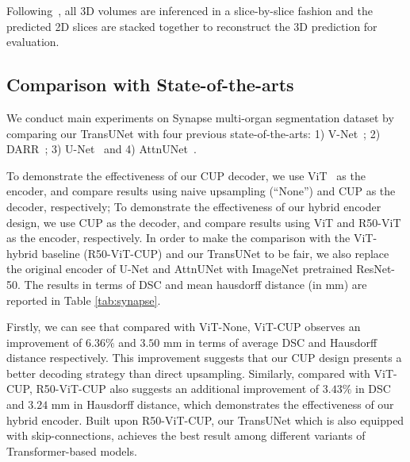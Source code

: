 \documentclass[runningheads]{llncs}
\begin{document}
Following~\cite{zhou2017fixed,yu2018recurrent}, all 3D volumes are inferenced in a slice-by-slice fashion and the predicted 2D slices are stacked together to reconstruct the 3D prediction for evaluation.

\subsection{Comparison with State-of-the-arts}
\label{sec:comparison}


We conduct main experiments on Synapse multi-organ segmentation dataset by comparing our TransUNet with four previous state-of-the-arts: 1) V-Net~\cite{milletari2016v}; 2) DARR~\cite{fu2020domain}; 3) U-Net~\cite{ronneberger2015u} and 4) AttnUNet~\cite{schlemper2019attention}. 

To demonstrate the effectiveness of our CUP decoder, we use ViT~\cite{dosovitskiy2020image} as the encoder, and compare results using naive upsampling (``None'') and CUP as the decoder, respectively;
To demonstrate the effectiveness of our hybrid encoder design, we use CUP as the decoder, and compare results using ViT and R50-ViT as the encoder, respectively.
In order to make the comparison with the ViT-hybrid baseline (R50-ViT-CUP) and our TransUNet to be fair, we also replace the original encoder of U-Net \cite{ronneberger2015u} and AttnUNet \cite{oktay2018attention} with ImageNet pretrained ResNet-50.
The results in terms of DSC and mean hausdorff distance (in mm) are reported in Table \ref{tab:synapse}. 


Firstly, we can see that compared with ViT-None, ViT-CUP observes an improvement of $6.36\%$ and $3.50$ mm in terms of average DSC and Hausdorff distance respectively. This improvement suggests that our CUP design presents a better decoding strategy than direct upsampling. 
Similarly, compared with ViT-CUP, R50-ViT-CUP also suggests an additional improvement of $3.43\%$ in DSC and $3.24$ mm in Hausdorff distance, which demonstrates the effectiveness of our hybrid encoder.
Built upon R50-ViT-CUP, our TransUNet which is also equipped with skip-connections,  achieves the best result among different variants of Transformer-based models.
\end{document}
